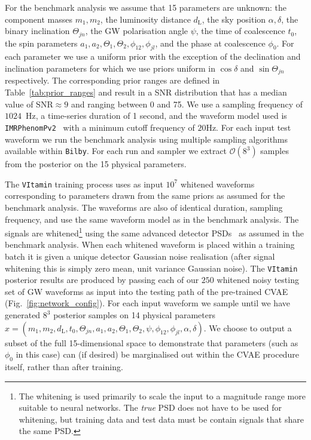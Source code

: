 %
%
For the benchmark analysis we assume that 15 parameters are
unknown: the component masses
$m_1,m_2$, the luminosity distance $d_{\text{L}}$, the sky position
$\alpha,\delta$, the binary inclination $\Theta_{jn}$, the \ac{GW} polarisation
angle ${\psi}$, the time of coalescence $t_{0}$, the spin parameters $a_1,a_2,
\Theta_1,\Theta_2,\phi_{12},\phi_{jl}$, and the phase at coalescence
$\phi_0$. For each parameter we use a uniform prior with the exception of
the declination and inclination parameters for which we use priors uniform in
$\cos\delta$ and $\sin\Theta_{jn}$ respectively. The corresponding prior ranges
are defined in Table~\ref{tab:prior_ranges} and result in a  \ac{SNR}
distribution that has a median value of $\text{SNR}\approx 9$ and ranging between 0 and 75.
We use a sampling frequency of $1024$~Hz, a time-series duration of 1 second, and
the waveform model used is \texttt{IMRPhenomPv2}~\cite{1809.10113} with a
minimum cutoff frequency of $20$Hz. For each input test waveform we run the
benchmark analysis using multiple sampling algorithms available within
\texttt{Bilby}. For each run and sampler we extract $\mathcal{O}(8^3)$
samples from the posterior on the 15 physical parameters.  

%
%
The \texttt{VItamin} training process uses as input $10^{7}$ whitened
waveforms corresponding to parameters drawn from the same priors as assumed for
the benchmark analysis. The waveforms are also of identical duration, sampling
frequency, and use the same waveform model as in the benchmark analysis.
The signals are whitened\footnote{The whitening is used primarily to
scale the input to a magnitude range more suitable to neural networks. The
\emph{true} \ac{PSD} does not have to be used for whitening, but training data
and test data must be contain signals that share the same \ac{PSD}.}
using the same advanced detector \acp{PSD}~\cite{aligo_noisecurves} as
assumed in the benchmark analysis. When each whitened waveform is placed
within a training batch it is given a unique detector Gaussian noise
realisation (after signal whitening this is simply zero mean, unit
variance Gaussian noise). The \texttt{VItamin} posterior results are produced by
passing each of our $250$ whitened noisy testing set of \ac{GW} waveforms
as input into the testing path of the pre-trained
\ac{CVAE} (Fig.~\ref{fig:network_config}). For each input waveform we sample until we
have generated $8^3$ posterior samples on 14 physical parameters
$x=(m_1,m_2,d_{\text{L}},t_{0},\Theta_{jn},a_1,a_2,\Theta_1,\Theta_2,\psi,
\phi_{12},\phi_{jl},\alpha,\delta)$. We choose to
output a subset of the full 15-dimensional space to demonstrate that parameters
(such as $\phi_0$ in this case) can (if desired) be
marginalised out within the \ac{CVAE} procedure itself, rather than after
training. 

